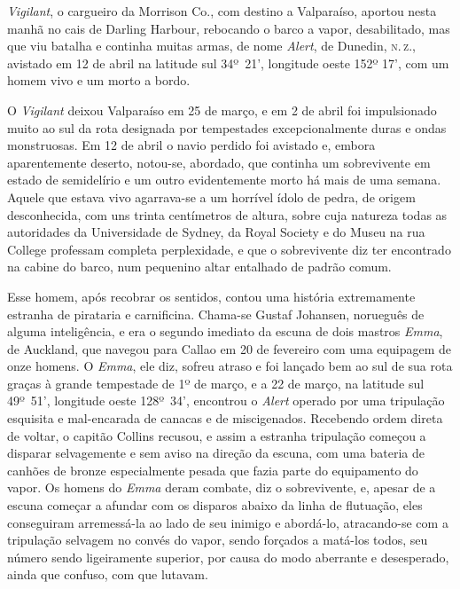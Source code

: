 \emph{Vigilant}, o cargueiro da Morrison Co., com destino a Valparaíso,
aportou nesta manhã no cais de Darling Harbour, rebocando o barco a
vapor, desabilitado, mas que viu batalha e continha muitas armas, de
nome \emph{Alert}, de Dunedin, \textsc{n.\,z.}, avistado em 12 de abril na latitude
sul 34º~21', longitude oeste 152º 17', com um homem vivo e um morto a bordo.

O \emph{Vigilant} deixou Valparaíso em 25 de março, e em 2 de abril foi
impulsionado muito ao sul da rota designada por tempestades
excepcionalmente duras e ondas monstruosas. Em 12 de abril o navio
perdido foi avistado e, embora aparentemente deserto, notou-se,
abordado, que continha um sobrevivente em estado de semidelírio e um
outro evidentemente morto há mais de uma semana. Aquele que estava vivo
agarrava-se a um horrível ídolo de pedra, de origem desconhecida, com
uns trinta centímetros de altura, sobre cuja natureza todas as
autoridades da Universidade de Sydney, da Royal Society e do Museu na rua
College professam completa perplexidade, e que o sobrevivente diz
ter encontrado na cabine do barco, num pequenino altar entalhado de
padrão comum.

Esse homem, após recobrar os sentidos, contou uma história extremamente
estranha de pirataria e carnificina. Chama-se Gustaf Johansen, norueguês
de alguma inteligência, e era o segundo imediato da escuna de dois
mastros \emph{Emma}, de Auckland, que navegou para Callao em 20 de
fevereiro com uma equipagem de onze homens. O \emph{Emma}, ele diz,
sofreu atraso e foi lançado bem ao sul de sua rota graças à grande
tempestade de 1º de março, e a 22 de março, na
latitude sul 49º~51', longitude
oeste 128º~34', encontrou o \emph{Alert} operado por uma tripulação
esquisita e mal-encarada de canacas e de miscigenados. Recebendo ordem
direta de voltar, o capitão Collins recusou, e assim a estranha
tripulação começou a disparar selvagemente e sem aviso na direção da
escuna, com uma bateria de canhões de bronze especialmente pesada que
fazia parte do equipamento do vapor. Os homens do \emph{Emma} deram
combate, diz o sobrevivente, e, apesar de a escuna começar a afundar com
os disparos abaixo da linha de flutuação, eles conseguiram arremessá-la
ao lado de seu inimigo e abordá-lo, atracando-se com a tripulação
selvagem no convés do vapor, sendo forçados a matá-los todos, seu número
sendo ligeiramente superior, por causa do modo aberrante e desesperado,
ainda que confuso, com que lutavam.


